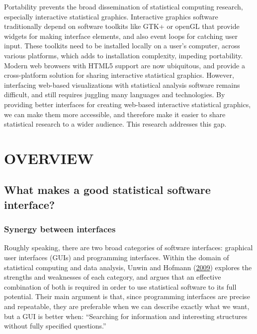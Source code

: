 \documentclass[12pt,]{isuthesis}
\begin{document}
Portability prevents the broad dissemination of statistical computing
research, especially interactive statistical graphics. Interactive
graphics software traditionally depend on software toolkits like GTK+ or
openGL that provide widgets for making interface elements, and also
event loops for catching user input. These toolkits need to be installed
locally on a user's computer, across various platforms, which adds to
installation complexity, impeding portability. Modern web browsers with
HTML5 support are now ubiquitous, and provide a cross-platform solution
for sharing interactive statistical graphics. However, interfacing
web-based visualizations with statistical analysis software remains
difficult, and still requires juggling many languages and technologies.
By providing better interfaces for creating web-based interactive
statistical graphics, we can make them more accessible, and therefore
make it easier to share statistical research to a wider audience. This
research addresses this gap.

\chapter{OVERVIEW}

\section{What makes a good statistical software
interface?}\label{what-makes-a-good-statistical-software-interface}

\subsection{Synergy between
interfaces}\label{synergy-between-interfaces}

Roughly speaking, there are two broad categories of software interfaces:
graphical user interfaces (GUIs) and programming interfaces. Within the
domain of statistical computing and data analysis, Unwin and Hofmann
(\protect\hyperlink{ref-Unwin:1999vp}{2009}) explores the strengths and
weaknesses of each category, and argues that an effective combination of
both is required in order to use statistical software to its full
potential. Their main argument is that, since programming interfaces are
precise and repeatable, they are preferable when we can describe exactly
what we want, but a GUI is better when: ``Searching for information and
interesting structures without fully specified questions.''
\end{document}
